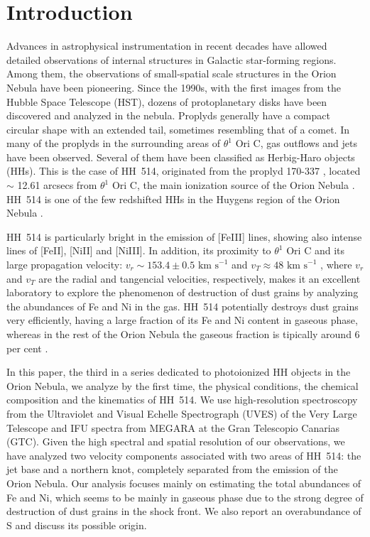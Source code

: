 \documentclass[fleqn,usenatbib]{mnras}
\begin{document}


\section{Introduction}
\label{sec:introduction}

Advances in astrophysical instrumentation in recent decades have allowed detailed observations of internal structures in Galactic star-forming regions. Among them, the observations of small-spatial scale structures in the Orion Nebula have been pioneering. Since the 1990s, with the first images from the Hubble Space Telescope (HST), dozens of protoplanetary disks \citep[proplyds,][]{Odell1993} have been discovered and analyzed in the nebula. Proplyds generally have a compact circular shape with an extended tail, sometimes resembling that of a comet. In many of the proplyds in the surrounding areas of $\theta^1$ Ori C, gas outflows and jets have been observed. Several of them have been classified as Herbig-Haro objects (HHs). This is the case of HH~514, originated from the proplyd 170-337 \citep[][]{bally00}, located $\sim$ 12.61 arcsecs from $\theta^1$ Ori C, the main ionization source of the Orion Nebula \citep[][]{ODell2017}. HH~514 is one of the few redshifted HHs in the Huygens region of the Orion Nebula \citep[][]{odellyhenney08}.

HH~514 is particularly bright in the emission of [Fe\thinspace III] lines, showing also intense lines of  [Fe\thinspace II], [Ni\thinspace II] and [Ni\thinspace III]. In addition, its proximity to $\theta^1$ Ori C and its large propagation velocity: $v_{r} \sim 153.4 \pm 0.5  \text{ km s}^{-1}$ and $ v_{T} \approx 48 \text{ km s}^{-1}$ \citep{odellyhenney08}, where $v_{r}$ and $v_{T}$ are the radial and tangencial velocities, respectively, makes it an excellent laboratory to explore the phenomenon of destruction of dust grains by analyzing the abundances of Fe and Ni in the gas. HH~514 potentially destroys dust grains very efficiently, having a large fraction of its Fe and Ni content in gaseous phase, whereas in the rest of the Orion Nebula the gaseous fraction is tipically around 6 per cent \citep[][]{mendez2021-2}.

In this paper, the third in a series dedicated to photoionized HH objects in the Orion Nebula, we analyze by the first time, the physical conditions, the chemical composition and the kinematics of HH~514. We use high-resolution spectroscopy from the Ultraviolet and Visual Echelle Spectrograph (UVES) \citep[][]{Dodorico00} of the Very Large Telescope and IFU spectra from MEGARA \citep{gildepaz+18} at the Gran Telescopio Canarias (GTC). Given the high spectral and spatial resolution of our observations, we have analyzed two velocity components associated with two areas of HH~514: the jet base and a northern knot, completely separated from the emission of the Orion Nebula. Our analysis focuses mainly on estimating the total abundances of Fe and Ni, which seems to be mainly in gaseous phase due to the strong degree of destruction of dust grains in the shock front. We also report an overabundance of S and discuss its possible origin.
\end{document}
